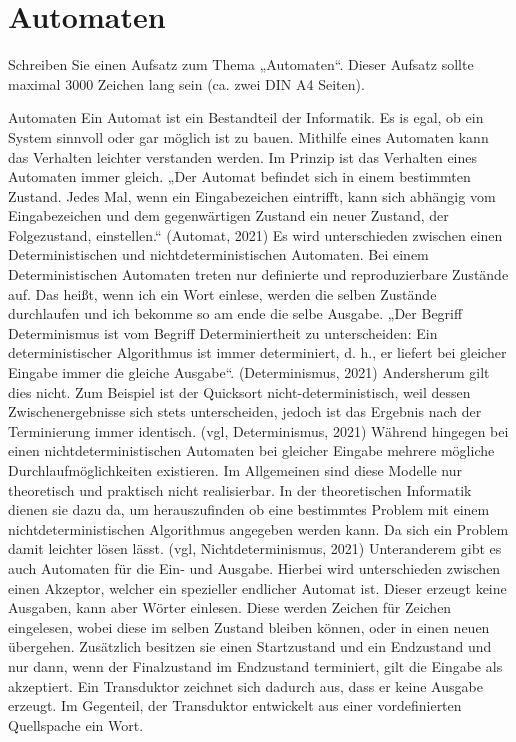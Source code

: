 \section{Automaten}
Schreiben Sie einen Aufsatz zum Thema „Automaten“. Dieser Aufsatz sollte maximal 3000 Zeichen lang sein (ca. zwei DIN A4 Seiten).

Automaten
Ein Automat ist ein Bestandteil der Informatik. Es is egal, ob ein System sinnvoll oder gar möglich ist zu bauen. Mithilfe eines Automaten kann das Verhalten leichter verstanden werden. Im Prinzip ist das Verhalten eines Automaten immer gleich. „Der Automat befindet sich in einem bestimmten Zustand. Jedes Mal, wenn ein Eingabezeichen eintrifft, kann sich abhängig vom Eingabezeichen und dem gegenwärtigen Zustand ein neuer Zustand, der Folgezustand, einstellen.“ (Automat, 2021)
Es wird unterschieden zwischen einen Deterministischen und nichtdeterministischen Automaten. Bei einem  Deterministischen Automaten treten nur definierte und reproduzierbare Zustände auf. Das heißt, wenn ich ein Wort einlese, werden die selben Zustände durchlaufen und ich bekomme so am ende die selbe Ausgabe. „Der Begriff Determinismus ist vom Begriff Determiniertheit zu unterscheiden: Ein deterministischer Algorithmus ist immer determiniert, d. h., er liefert bei gleicher Eingabe immer die gleiche Ausgabe“. (Determinismus, 2021) Andersherum gilt dies nicht. Zum Beispiel ist der Quicksort nicht-deterministisch, weil dessen Zwischenergebnisse sich stets unterscheiden, jedoch ist das Ergebnis nach der Terminierung immer identisch. (vgl, Determinismus, 2021) 
Während hingegen bei einen nichtdeterministischen Automaten bei gleicher Eingabe mehrere mögliche Durchlaufmöglichkeiten existieren. Im Allgemeinen sind diese Modelle nur theoretisch und praktisch nicht realisierbar. In der theoretischen Informatik dienen sie dazu da, um herauszufinden ob eine bestimmtes Problem mit einem nichtdeterministischen Algorithmus angegeben werden kann. Da sich ein Problem damit leichter lösen lässt. (vgl, Nichtdeterminismus, 2021) 
Unteranderem gibt es auch Automaten für die Ein- und Ausgabe. Hierbei wird unterschieden zwischen einen Akzeptor, welcher ein spezieller endlicher Automat ist. Dieser erzeugt keine Ausgaben, kann aber Wörter einlesen. Diese werden Zeichen für Zeichen eingelesen, wobei diese im selben Zustand bleiben können, oder in einen neuen übergehen. Zusätzlich besitzen sie einen Startzustand und ein Endzustand und nur dann, wenn der Finalzustand im Endzustand terminiert, gilt die Eingabe als akzeptiert. Ein Transduktor zeichnet sich dadurch aus, dass er keine Ausgabe erzeugt. Im Gegenteil, der Transduktor entwickelt aus einer vordefinierten Quellspache ein Wort. 
